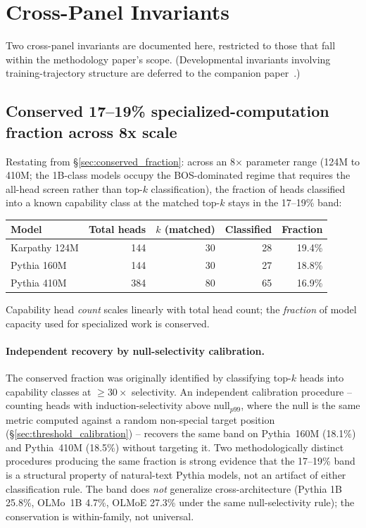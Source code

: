 \documentclass[11pt]{article}
\begin{document}
\section{Cross-Panel Invariants}
\label{sec:invariants}

Two cross-panel invariants are documented here, restricted to those that fall within the methodology paper's scope. (Developmental invariants involving training-trajectory structure are deferred to the companion paper~\citep{paper2_developmental}.)

\subsection{Conserved 17--19\% specialized-computation fraction across 8x scale}
\label{sec:invariant_fraction}

Restating from \S\ref{sec:conserved_fraction}: across an 8$\times$ parameter range (124M to 410M; the 1B-class models occupy the BOS-dominated regime that requires the all-head screen rather than top-$k$ classification), the fraction of heads classified into a known capability class at the matched top-$k$ stays in the 17--19\% band:

\begin{center}
\small
\begin{tabular}{lrrrr}
\toprule
Model & Total heads & $k$ (matched) & Classified & Fraction \\
\midrule
Karpathy 124M & 144 & 30 & 28 & 19.4\% \\
Pythia 160M   & 144 & 30 & 27 & 18.8\% \\
Pythia 410M   & 384 & 80 & 65 & 16.9\% \\
\bottomrule
\end{tabular}
\end{center}

Capability head \emph{count} scales linearly with total head count; the \emph{fraction} of model capacity used for specialized work is conserved.

\paragraph{Independent recovery by null-selectivity calibration.} The conserved fraction was originally identified by classifying top-$k$ heads into capability classes at $\geq 30\times$ selectivity. An independent calibration procedure -- counting heads with induction-selectivity above null$_{p99}$, where the null is the same metric computed against a random non-special target position (\S\ref{sec:threshold_calibration}) -- recovers the same band on Pythia~160M (18.1\%) and Pythia~410M (18.5\%) without targeting it. Two methodologically distinct procedures producing the same fraction is strong evidence that the 17--19\% band is a structural property of natural-text Pythia models, not an artifact of either classification rule. The band does \emph{not} generalize cross-architecture (Pythia 1B 25.8\%, OLMo~1B 4.7\%, OLMoE 27.3\% under the same null-selectivity rule); the conservation is within-family, not universal.
\end{document}
